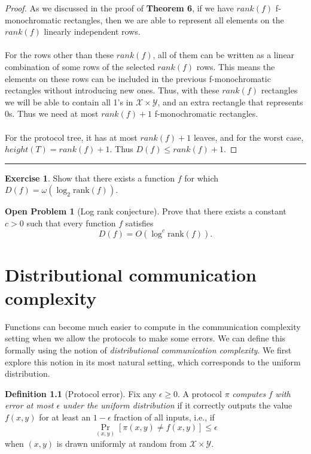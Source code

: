 \documentclass[11pt,oneside]{book}
\theoremstyle{plain}
\theoremstyle{definition}
\newtheorem{definition}{Definition}
\newtheorem{exercise}{Exercise}
\newtheorem{open}{Open Problem}
\theoremstyle{plain}
\newcommand{\calX}{\mathcal{X}}
\newcommand{\calY}{\mathcal{Y}}
\newcommand{\rank}{\mathrm{rank}}
\newcommand{\exercises}{\bigskip \noindent\rule{8cm}{0.4pt} \medskip}
\begin{document}
\begin{proof}
	As we discussed in the proof of \textbf{Theorem 6}, if we have $rank(f)$ f-monochromatic rectangles, then we are able to represent all elements on the $rank(f)$ linearly independent rows. \\
	\\
	For the rows other than these $rank(f)$, all of them can be written as a linear combination of some rows of the selected $rank(f)$ rows. This means the elements on these rows can be included in the previous f-monochromatic rectangles without introducing new ones. Thus, with these $rank(f)$ rectangles we will be able to contain all 1's in $\calX \times \calY$, and an extra rectangle that represents $0$s. Thus we need at most $rank(f)+1$ f-monochromatic rectangles.\\
	\\
	For the protocol tree, it has at most $rank(f)+1$ leaves, and for the worst case, $height(T) = rank(f)+1$. Thus $D(f) \leq rank(f)+1$.
\end{proof}

\exercises

\begin{exercise} %
	Show that there exists a function $f$ for which $D(f) = \omega( \log_2 \rank(f) )$.
\end{exercise}

\begin{open}[Log rank conjecture]
	Prove that there exists a constant $c > 0$ such that every function $f$ satisfies
	\[
	D(f) = O( \log^c \rank(f)).
	\]
\end{open}

	


\chapter[CH03]{Distributional communication complexity}

Functions can become much easier to compute in the communication complexity setting when we allow the protocols to make some errors. We can define this formally using the notion of \emph{distributional communication complexity}. We first explore this notion in its most natural setting, which corresponds to the uniform distribution.
\newpage
\begin{definition}[Protocol error]
	Fix any $\epsilon \ge 0$. A protocol $\pi$ \emph{computes} $f$ \emph{with error at most $\epsilon$ under the uniform distribution} if it correctly outputs the value $f(x,y)$ for at least an $1-\epsilon$ fraction of all inputs, i.e., if
	\[
	\Pr_{(x,y)}[ \pi(x,y) \neq f(x,y)] \le \epsilon
	\]
	when $(x,y)$ is drawn uniformly at random from $\calX \times \calY$.
\end{definition}
\end{document}
